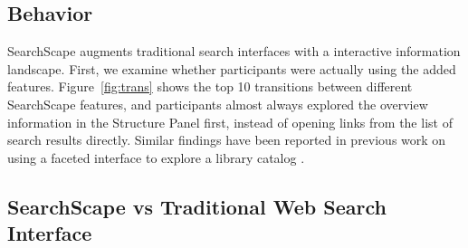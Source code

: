 \subsection{Behavior}

SearchScape augments traditional search interfaces with a interactive information landscape. First, we examine whether participants were actually using the added features. 
Figure~\ref{fig:trans} shows the top 10 transitions between different SearchScape features, and
participants almost always explored the overview information in the Structure Panel first, instead of opening links from the list of search results directly. Similar findings have been reported in previous work on using a faceted interface to explore a library catalog \cite{kules2009exploratory}.




\subsection{SearchScape vs Traditional Web Search Interface}


